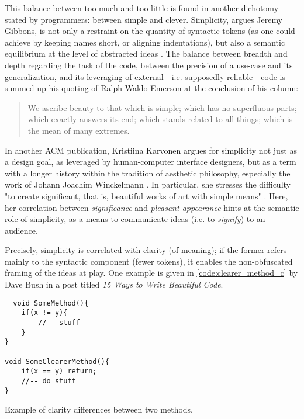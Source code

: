 This balance between too much and too little is found in another dichotomy stated by programmers: between simple and clever. Simplicity, argues Jeremy Gibbons, is not only a restraint on the quantity of syntactic tokens (as one could achieve by keeping names short, or aligning indentations), but also a semantic equilibrium at the level of abstracted ideas \citep{gibbons_beauty_2012}. The balance between breadth and depth regarding the task of the code, between the precision of a use-case and its generalization, and its leveraging of external—i.e. supposedly reliable—code is summed up his quoting of Ralph Waldo Emerson at the conclusion of his column:

\begin{quote}
  We ascribe beauty to that which is simple; which has no superfluous parts; which exactly answers its end; which stands related to all things; which is the mean of many extremes. \citep{gibbons_beauty_2012}
\end{quote}

In another ACM publication, Kristiina Karvonen argues for simplicity not just as a design goal, as leveraged by human-computer interface designers, but as a term with a longer history within the tradition of aesthetic philosophy, especially the work of Johann Joachim Winckelmann \citep{karvonen_beauty_2000}. In particular, she stresses the difficulty "to create significant, that is, beautiful works of art with simple means" \citep{karvonen_beauty_2000}. Here, her correlation between \emph{significance} and \emph{pleasant appearance} hints at the semantic role of simplicity, as a means to communicate ideas (i.e. to \emph{signify}) to an audience.

Precisely, simplicity is correlated with clarity (of meaning); if the former refers mainly to the syntactic component (fewer tokens), it enables the non-obfuscated framing of the ideas at play. One example is given in \ref{code:clearer_method_c} by Dave Bush in a post titled  \emph{15 Ways to Write Beautiful Code}.

\begin{listing}
  \begin{verbatim}
  void SomeMethod(){
    if(x != y){
        //-- stuff
    }
}

void SomeClearerMethod(){
    if(x == y) return;
    //-- do stuff
}
\end{verbatim}
  \caption{Example of clarity differences between two methods.}
  \label{code:clearer_method_c}
\end{listing}

